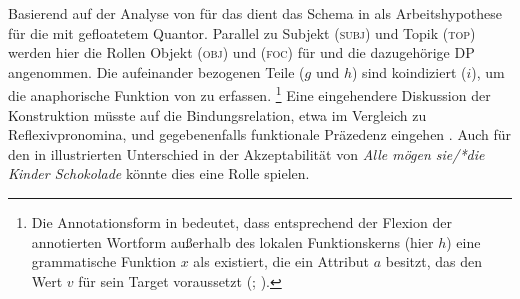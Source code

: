 Basierend auf der Analyse von \citet{spector2009} für das  dient das
Schema in  als Arbeits\-hypothese für die
 mit gefloatetem Quantor. Parallel zu Subjekt (\textsc{subj}) und
Topik (\textsc{top}) werden hier die Rollen Objekt (\textsc{obj}) und
 (\textsc{foc}) für  und die dazugehörige
DP angenommen. Die aufeinander bezogenen Teile ($g$ und
$h$) sind koindiziert ($i$), um die anaphorische
Funktion von  zu erfassen.%
%
	\footnote{Die Annotationsform
		 in 
		bedeutet, dass entsprechend der Flexion der annotierten Wortform
		außerhalb des lokalen Funktionskerns (hier $h$) eine grammatische
		Funktion $x$ als  existiert, die ein
		Attribut $a$ besitzt, das den Wert $v$ für sein Target
		voraussetzt (;
		\cite[66--70]{bresnanetal2016}).}
%
Eine eingehendere Diskussion der Konstruktion müsste auf die
Bindungsrelation, etwa im Vergleich zu
Reflexivpronomina, und gegebenenfalls funktionale
Präzedenz eingehen \autocite[vgl.][213, 254--285]{bresnanetal2016}. Auch für
den in  illustrierten Unterschied in der Akzeptabilität von
\textit{Alle mögen sie/*die Kinder Schokolade} könnte dies eine Rolle spielen.


